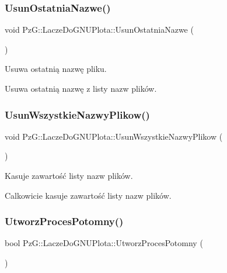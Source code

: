 \subsubsection{\texorpdfstring{Usun\+Ostatnia\+Nazwe()}{UsunOstatniaNazwe()}}
{\footnotesize\ttfamily void Pz\+G\+::\+Lacze\+Do\+G\+N\+U\+Plota\+::\+Usun\+Ostatnia\+Nazwe (\begin{DoxyParamCaption}{ }\end{DoxyParamCaption})}



Usuwa ostatnią nazwę pliku. 

Usuwa ostatnią nazwę z listy nazw plików. \mbox{\label{classPzG_1_1LaczeDoGNUPlota_a89a1d90d017d264cd26398464d074073}} 
\subsubsection{\texorpdfstring{Usun\+Wszystkie\+Nazwy\+Plikow()}{UsunWszystkieNazwyPlikow()}}
{\footnotesize\ttfamily void Pz\+G\+::\+Lacze\+Do\+G\+N\+U\+Plota\+::\+Usun\+Wszystkie\+Nazwy\+Plikow (\begin{DoxyParamCaption}{ }\end{DoxyParamCaption})}



Kasuje zawartość listy nazw plików. 

Calkowicie kasuje zawartość listy nazw plików. \mbox{\label{classPzG_1_1LaczeDoGNUPlota_a1c7b9acc40de8d8bbb40fb0722512933}} 
\subsubsection{\texorpdfstring{Utworz\+Proces\+Potomny()}{UtworzProcesPotomny()}}
{\footnotesize\ttfamily bool Pz\+G\+::\+Lacze\+Do\+G\+N\+U\+Plota\+::\+Utworz\+Proces\+Potomny (\begin{DoxyParamCaption}{ }\end{DoxyParamCaption})\hspace{0.3cm}{\ttfamily [protected]}}




